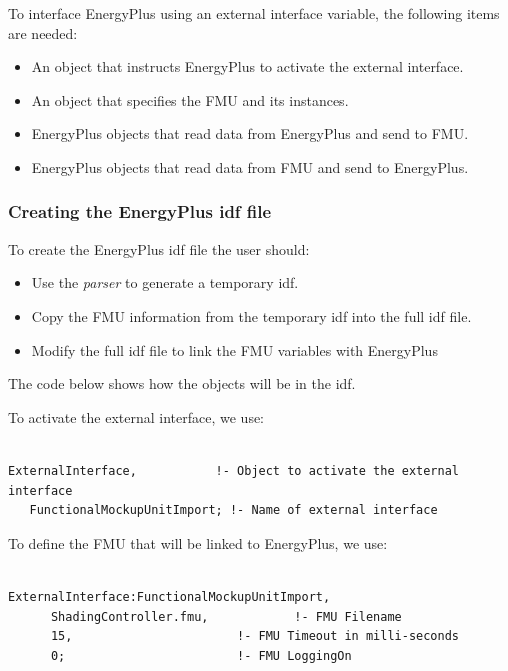 To interface EnergyPlus using an external interface variable, the following items are needed:

\begin{itemize}
\item
  An object that instructs EnergyPlus to activate the external interface.
\item
  An object that specifies the FMU and its instances.
\item
  EnergyPlus objects that read data from EnergyPlus and send to FMU.
\item
  EnergyPlus objects that read data from FMU and send to EnergyPlus.
\end{itemize}

\subsubsection{Creating the EnergyPlus idf file}\label{creating-the-energyplus-idf-file-2-000}

To create the EnergyPlus idf file the user should:

\begin{itemize}
\item
  Use the \emph{parser} to generate a temporary idf.
\item
  Copy the FMU information from the temporary idf into the full idf file.
\item
  Modify the full idf file to link the FMU variables with EnergyPlus
\end{itemize}

The code below shows how the objects will be in the idf.

To activate the external interface, we use:

\begin{lstlisting}

ExternalInterface,           !- Object to activate the external interface
   FunctionalMockupUnitImport; !- Name of external interface
\end{lstlisting}

To define the FMU that will be linked to EnergyPlus, we use:

\begin{lstlisting}

ExternalInterface:FunctionalMockupUnitImport,
      ShadingController.fmu,            !- FMU Filename
      15,                       !- FMU Timeout in milli-seconds
      0;                        !- FMU LoggingOn
\end{lstlisting}

